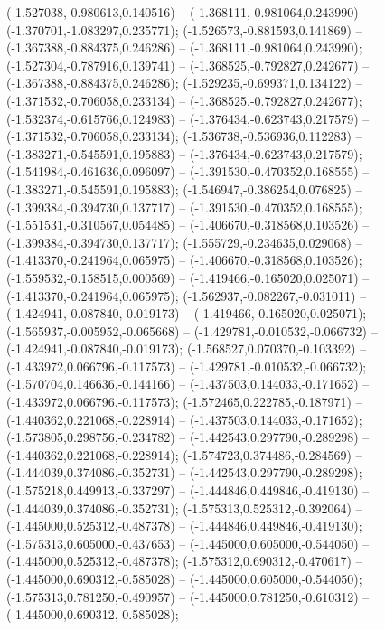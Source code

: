  (-1.527038,-0.980613,0.140516) -- (-1.368111,-0.981064,0.243990) -- (-1.370701,-1.083297,0.235771);
 (-1.526573,-0.881593,0.141869) -- (-1.367388,-0.884375,0.246286) -- (-1.368111,-0.981064,0.243990);
 (-1.527304,-0.787916,0.139741) -- (-1.368525,-0.792827,0.242677) -- (-1.367388,-0.884375,0.246286);
 (-1.529235,-0.699371,0.134122) -- (-1.371532,-0.706058,0.233134) -- (-1.368525,-0.792827,0.242677);
 (-1.532374,-0.615766,0.124983) -- (-1.376434,-0.623743,0.217579) -- (-1.371532,-0.706058,0.233134);
 (-1.536738,-0.536936,0.112283) -- (-1.383271,-0.545591,0.195883) -- (-1.376434,-0.623743,0.217579);
 (-1.541984,-0.461636,0.096097) -- (-1.391530,-0.470352,0.168555) -- (-1.383271,-0.545591,0.195883);
 (-1.546947,-0.386254,0.076825) -- (-1.399384,-0.394730,0.137717) -- (-1.391530,-0.470352,0.168555);
 (-1.551531,-0.310567,0.054485) -- (-1.406670,-0.318568,0.103526) -- (-1.399384,-0.394730,0.137717);
 (-1.555729,-0.234635,0.029068) -- (-1.413370,-0.241964,0.065975) -- (-1.406670,-0.318568,0.103526);
 (-1.559532,-0.158515,0.000569) -- (-1.419466,-0.165020,0.025071) -- (-1.413370,-0.241964,0.065975);
 (-1.562937,-0.082267,-0.031011) -- (-1.424941,-0.087840,-0.019173) -- (-1.419466,-0.165020,0.025071);
 (-1.565937,-0.005952,-0.065668) -- (-1.429781,-0.010532,-0.066732) -- (-1.424941,-0.087840,-0.019173);
 (-1.568527,0.070370,-0.103392) -- (-1.433972,0.066796,-0.117573) -- (-1.429781,-0.010532,-0.066732);
 (-1.570704,0.146636,-0.144166) -- (-1.437503,0.144033,-0.171652) -- (-1.433972,0.066796,-0.117573);
 (-1.572465,0.222785,-0.187971) -- (-1.440362,0.221068,-0.228914) -- (-1.437503,0.144033,-0.171652);
 (-1.573805,0.298756,-0.234782) -- (-1.442543,0.297790,-0.289298) -- (-1.440362,0.221068,-0.228914);
 (-1.574723,0.374486,-0.284569) -- (-1.444039,0.374086,-0.352731) -- (-1.442543,0.297790,-0.289298);
 (-1.575218,0.449913,-0.337297) -- (-1.444846,0.449846,-0.419130) -- (-1.444039,0.374086,-0.352731);
 (-1.575313,0.525312,-0.392064) -- (-1.445000,0.525312,-0.487378) -- (-1.444846,0.449846,-0.419130);
 (-1.575313,0.605000,-0.437653) -- (-1.445000,0.605000,-0.544050) -- (-1.445000,0.525312,-0.487378);
 (-1.575312,0.690312,-0.470617) -- (-1.445000,0.690312,-0.585028) -- (-1.445000,0.605000,-0.544050);
 (-1.575313,0.781250,-0.490957) -- (-1.445000,0.781250,-0.610312) -- (-1.445000,0.690312,-0.585028);
